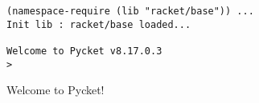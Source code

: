 

\begin{figure}[H]
  \centering
  \begin{minipage}{0.5\textwidth}
  \begin{lstlisting}[style=bashstyle]
(namespace-require (lib "racket/base")) ...
Init lib : racket/base loaded...

Welcome to Pycket v8.17.0.3
>\end{lstlisting}
  \end{minipage}
  \caption{Welcome to Pycket!}
  \label{fig:welcome-to-pycket}
\end{figure}

